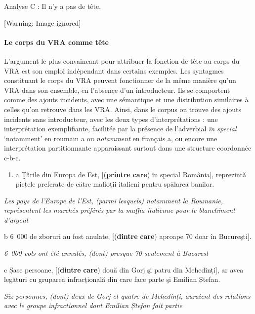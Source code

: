 {
Analyse C : Il n'y a pas de tête.
}

{   [Warning: Image ignored] %
} 

\paragraph[Le corps du VRA comme tête]{Le corps du VRA comme tête}
L'argument le plus convaincant pour attribuer la fonction de tête au corps du VRA est son emploi indépendant dans certains exemples. Les syntagmes constituant le corps du VRA peuvent fonctionner de la même manière qu'un VRA dans son ensemble, en l'absence d'un introducteur. Ils se comportent comme des ajouts incidents, avec une sémantique et une distribution similaires à celles qu'on retrouve dans les VRA. Ainsi, dans le corpus on trouve des ajouts incidents sans introducteur, avec les deux types d'interprétations : une interprétation exemplifiante, facilitée par la présence de l'adverbial \textit{în special} `notamment' en roumain a ou \textit{notamment} en français a, ou encore une interprétation partitionnante apparaissant surtout dans une structure coordonnée c-b-c.


\begin{enumerate}
\item \label{bkm:Ref296067471}a  \c{T}ările din Europa de Est, [(\textbf{printre} \textbf{care}) în special România], reprezintă piețele preferate de către mafioții italieni pentru spălarea banilor.  


\end{enumerate}
{\itshape
Les pays de l'Europe de l'Est, (parmi lesquels) notamment la Roumanie, représentent les marchés préférés par la maffia italienne pour le blanchiment  d'argent}

  b  6~000 de zboruri au fost anulate, [(\textbf{dintre} \textbf{care}) aproape 70 doar în Bucureşti].

{\itshape
6~000 vols ont été annulés, (dont) presque 70 seulement à Bucarest}

  c  Șase persoane, [(\textbf{dintre} \textbf{care}) două din Gorj şi patru din Mehedinți], ar avea legături cu gruparea infracțională din care face parte şi Emilian Ștefan.

    \textit{Six personnes, (dont) deux de Gorj et quatre de Mehedinți, auraient des relations avec le groupe infractionnel dont Emilian Ștefan fait partie}


